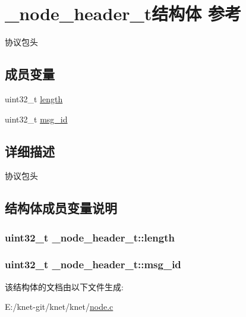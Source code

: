 \hypertarget{a00035}{}\section{\+\_\+node\+\_\+header\+\_\+t结构体 参考}
\label{a00035}


协议包头  


\subsection*{成员变量}
\begin{DoxyCompactItemize}
\item 
uint32\+\_\+t \hyperlink{a00035_a0f52ea6a88dafa44de8fb450408bbb43_a0f52ea6a88dafa44de8fb450408bbb43}{length}
\item 
uint32\+\_\+t \hyperlink{a00035_a699f9f8489a2d9be048da921e52bd8a6_a699f9f8489a2d9be048da921e52bd8a6}{msg\+\_\+id}
\end{DoxyCompactItemize}


\subsection{详细描述}
协议包头 

\subsection{结构体成员变量说明}
\hypertarget{a00035_a0f52ea6a88dafa44de8fb450408bbb43_a0f52ea6a88dafa44de8fb450408bbb43}{}
\subsubsection[{length}]{\setlength{\rightskip}{0pt plus 5cm}uint32\+\_\+t \+\_\+node\+\_\+header\+\_\+t\+::length}\label{a00035_a0f52ea6a88dafa44de8fb450408bbb43_a0f52ea6a88dafa44de8fb450408bbb43}
\hypertarget{a00035_a699f9f8489a2d9be048da921e52bd8a6_a699f9f8489a2d9be048da921e52bd8a6}{}
\subsubsection[{msg\+\_\+id}]{\setlength{\rightskip}{0pt plus 5cm}uint32\+\_\+t \+\_\+node\+\_\+header\+\_\+t\+::msg\+\_\+id}\label{a00035_a699f9f8489a2d9be048da921e52bd8a6_a699f9f8489a2d9be048da921e52bd8a6}


该结构体的文档由以下文件生成\+:\begin{DoxyCompactItemize}
\item 
E\+:/knet-\/git/knet/knet/\hyperlink{a00101}{node.\+c}\end{DoxyCompactItemize}
